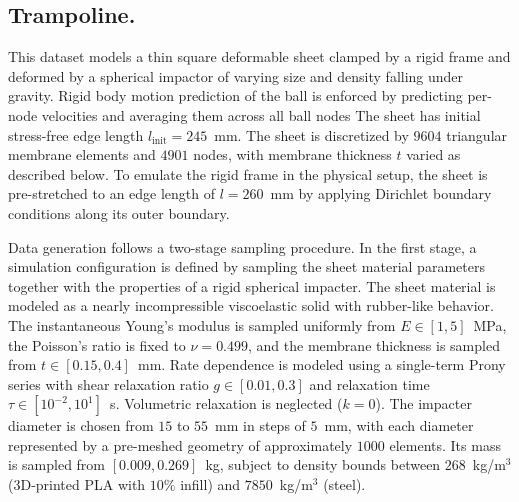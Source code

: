\subsection{Trampoline.}
%
% 
This dataset models a thin square deformable sheet clamped by a rigid frame and deformed by a spherical impactor of varying size and density falling under gravity. Rigid body motion prediction of the ball is enforced by predicting per-node velocities and averaging them across all ball nodes
The sheet has initial stress-free edge length $l_{\textrm{init}}=245$~mm.
The sheet is discretized by $9604$ triangular membrane elements and $4901$ nodes, with membrane thickness $t$ varied as described below. 
To emulate the rigid frame in the physical setup, the sheet is pre-stretched to an edge length of $l=260$~mm by applying Dirichlet boundary conditions along its outer boundary.
%
\par
%
Data generation follows a two-stage sampling procedure. 
%
In the first stage, a simulation configuration is defined by sampling the sheet material parameters together with the properties of a rigid spherical impacter. 
%
The sheet material is modeled as a nearly incompressible viscoelastic solid with rubber-like behavior. 
%
The instantaneous Young's modulus is sampled uniformly from $E \in [1,5]$~MPa, the Poisson's ratio is fixed to $\nu=0.499$, and the membrane thickness is sampled from $t \in [0.15,0.4]$~mm. 
%
Rate dependence is modeled using a single-term Prony series with shear relaxation ratio $g \in [0.01,0.3]$ and relaxation time $\tau \in [10^{-2},10^{1}]$~s.
%
Volumetric relaxation is neglected ($k=0$). 
%
The impacter diameter is chosen from $15$ to $55$~mm in steps of $5$~mm, with each diameter represented by a pre-meshed geometry of approximately $1000$ elements. 
%
Its mass is sampled from $[0.009,0.269]$~kg, subject to density bounds between $268$~kg/m$^3$ (3D-printed PLA with $10\%$ infill) and $7850$~kg/m$^3$ (steel).
